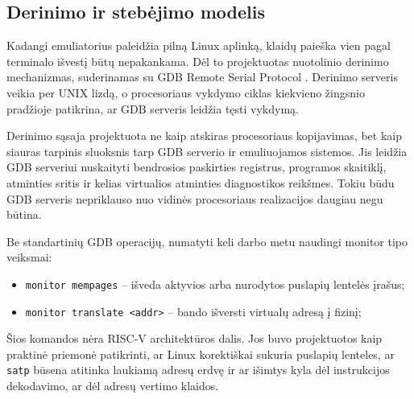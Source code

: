 \subsection{Derinimo ir stebėjimo modelis}
\label{sec:derinimo-modelis}

Kadangi emuliatorius paleidžia pilną Linux aplinką, klaidų paieška vien pagal terminalo išvestį būtų nepakankama. Dėl to projektuotas nuotolinio derinimo mechanizmas, suderinamas su GDB Remote Serial Protocol \cite{gdb-remote-protocol}. Derinimo serveris veikia per UNIX lizdą, o procesoriaus vykdymo ciklas kiekvieno žingsnio pradžioje patikrina, ar GDB serveris leidžia tęsti vykdymą.

Derinimo sąsaja projektuota ne kaip atskiras procesoriaus kopijavimas, bet kaip siauras tarpinis sluoksnis tarp GDB serverio ir emuliuojamos sistemos. Jis leidžia GDB serveriui nuskaityti bendrosios paskirties registrus, programos skaitiklį, atminties sritis ir kelias virtualios atminties diagnostikos reikšmes. Tokiu būdu GDB serveris nepriklauso nuo vidinės procesoriaus realizacijos daugiau negu būtina.

Be standartinių GDB operacijų, numatyti keli darbo metu naudingi monitor tipo veiksmai:

\begin{itemize}
    \item \texttt{monitor mempages} -- išveda aktyvios arba nurodytos puslapių lentelės įrašus;
    \item \texttt{monitor translate <addr>} -- bando išversti virtualų adresą į fizinį;
\end{itemize}

Šios komandos nėra RISC-V architektūros dalis. Jos buvo projektuotos kaip praktinė priemonė patikrinti, ar Linux korektiškai sukuria puslapių lenteles, ar \texttt{satp} būsena atitinka laukiamą adresų erdvę ir ar išimtys kyla dėl instrukcijos dekodavimo, ar dėl adresų vertimo klaidos.
